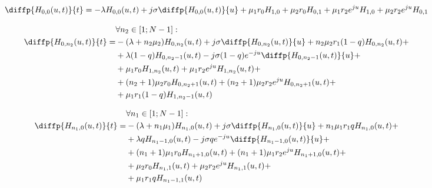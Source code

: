 \begin{equation}\label{hFirstEquation0}
\diffp{H_{0,0}(u,t)}{t}=
	-\lambda H_{0, 0}(u,t) + j\sigma\diffp{H_{0,0}(u,t)}{u}
	+ \mu_1 r_0 H_{1,0}+\mu_2 r_0 H_{0,1}
	+ \mu_1 r_2 e^{ju} H_{1,0} + \mu_2 r_2 e^{ju} H_{0,1}
\end{equation}

\begin{equation}\label{hFirstEquation1}
\begin{aligned}
&\forall n_2 \in [1;N-1]:\\
\diffp{H_{0, n_2}(u,t)}{t}=
	&-(\lambda+n_2\mu_2)H_{0, n_2}(u,t) + j\sigma\diffp{H_{0, n_2}(u,t)}{u}
		+n_2 \mu_2 r_1 (1-q) H_{0, n_2}(u,t)+\\ 
	&+ \lambda (1-q)H_{0, n_2-1}(u,t) 
		- j \sigma (1-q) e^{-ju} \diffp{H_{0, n_2-1}(u,t)}{u} +\\
	&+\mu_1 r_0 H_{1 , n_2}(u,t) 
		+ \mu_{1} r_{2} e^{ju}H_{1, n_2}(u,t)+\\
	&+(n_2+1) \mu_2 r_0 H_{0, n_2 + 1}(u,t) 
		+ (n_2+1) \mu_2 r_2 e^{ju} H_{0, n_2 + 1}(u,t)+\\
	&+\mu_1 r_1(1-q) H_{1 , n_2-1}(u,t)
\end{aligned}
\end{equation}

\begin{equation}\label{hFirstEquation2}
\begin{aligned}
&\forall n_1 \in [1;N-1]:\\
\diffp{H_{n_1, 0}(u,t)}{t}=
	&-(\lambda+n_1\mu_1)H_{n_1, 0}(u,t) + j\sigma \diffp{H_{n_1, 0}(u,t)}{u}
		+n_1 \mu_1 r_1 q H_{n_1, 0}(u,t)+\\ 
	&+ \lambda q H_{n_1-1, 0}(u,t) 
		- j \sigma q e^{-ju} \diffp{H_{n_1-1, 0}(u,t)}{u} +\\
	&+(n_1 + 1)\mu_1 r_0 H_{n_1+1, 0}(u,t) 
		+(n_1 + 1) \mu_{1} r_{2} e^{ju}H_{n_1+1, 0}(u,t)+\\
	&+\mu_2 r_0 H_{n_1, 1}(u,t) 
		+\mu_2 r_2 e^{ju} H_{n_1, 1}(u,t)+\\
	&+\mu_1 r_1 q H_{n_1-1 , 1}(u,t)
\end{aligned}
\end{equation}

